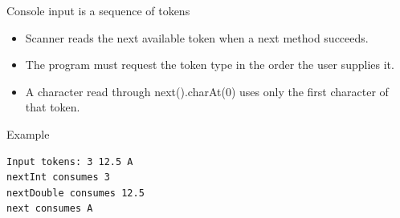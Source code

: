 \documentclass[10pt,aspectratio=169]{beamer}
\begin{document}
\begin{frame}[fragile,t]{Console input is a sequence of tokens}
\begin{itemize}
\item Scanner reads the next available token when a next method succeeds.
\item The program must request the token type in the order the user supplies it.
\item A character read through next().charAt(0) uses only the first character of that token.
\end{itemize}
\vspace{1mm}\begin{block}{Example}
\begin{lstlisting}
Input tokens: 3 12.5 A
nextInt consumes 3
nextDouble consumes 12.5
next consumes A
\end{lstlisting}
\end{block}
\end{frame}
\end{document}
